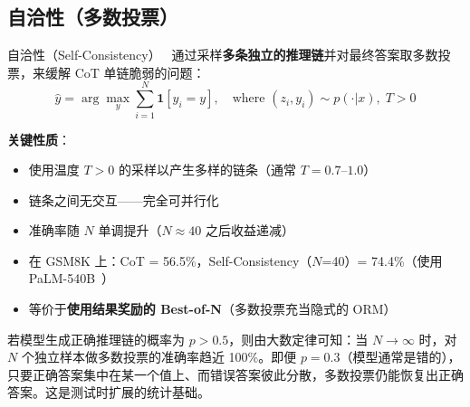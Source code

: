 \subsection{自洽性（多数投票）}
\label{self-consistency-majority-voting}

自洽性（Self-Consistency）~\cite{wang2023selfconsistency} 通过采样\textbf{多条独立的推理链}并对最终答案取多数投票，来缓解 CoT 单链脆弱的问题：
\begin{equation}
\hat{y} = \arg\max_{y} \sum_{i=1}^{N} \mathbf{1}[y_i = y], \quad \text{where } (z_i, y_i) \sim p(\cdot | x), \; T > 0
\end{equation}

\textbf{关键性质}：

\begin{itemize}
  \item 使用温度 $T > 0$ 的采样以产生多样的链条（通常 $T = 0.7$--$1.0$）
  \item 链条之间无交互——完全可并行化
  \item 准确率随 $N$ 单调提升（$N \approx 40$ 之后收益递减）
  \item 在 GSM8K 上：CoT = 56.5\%，Self-Consistency（$N$=40）= 74.4\%（使用 PaLM-540B~\cite{chowdhery2022palm}）
  \item 等价于\textbf{使用结果奖励的 Best-of-N}（多数投票充当隐式的 ORM）
\end{itemize}

\begin{intuitionbox}[多数投票为何有效]
若模型生成正确推理链的概率为 $p > 0.5$，则由大数定律可知：当 $N \to \infty$ 时，对 $N$ 个独立样本做多数投票的准确率趋近 100\%。即便 $p = 0.3$（模型通常是错的），只要正确答案集中在某一个值上、而错误答案彼此分散，多数投票仍能恢复出正确答案。这是测试时扩展的统计基础。
\end{intuitionbox}


